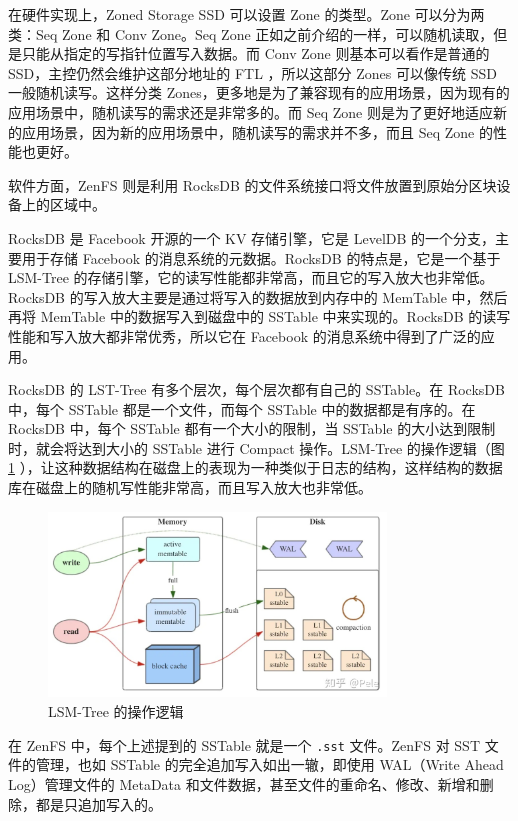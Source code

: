在硬件实现上，Zoned Storage SSD 可以设置 Zone 的类型。Zone 可以分为两类：Seq Zone 和 Conv Zone。Seq Zone 正如之前介绍的一样，可以随机读取，但是只能从指定的写指针位置写入数据。而 Conv Zone 则基本可以看作是普通的 SSD，主控仍然会维护这部分地址的 FTL ，所以这部分 Zones 可以像传统 SSD 一般随机读写。这样分类 Zones，更多地是为了兼容现有的应用场景，因为现有的应用场景中，随机读写的需求还是非常多的。而 Seq Zone 则是为了更好地适应新的应用场景，因为新的应用场景中，随机读写的需求并不多，而且 Seq Zone 的性能也更好。

软件方面，ZenFS 则是利用 RocksDB 的文件系统接口将文件放置到原始分区块设备上的区域中。

RocksDB 是 Facebook 开源的一个 KV 存储引擎，它是 LevelDB 的一个分支，主要用于存储 Facebook 的消息系统的元数据。RocksDB 的特点是，它是一个基于 LSM-Tree 的存储引擎，它的读写性能都非常高，而且它的写入放大也非常低。RocksDB 的写入放大主要是通过将写入的数据放到内存中的 MemTable 中，然后再将 MemTable 中的数据写入到磁盘中的 SSTable 中来实现的。RocksDB 的读写性能和写入放大都非常优秀，所以它在 Facebook 的消息系统中得到了广泛的应用。

RocksDB 的 LST-Tree 有多个层次，每个层次都有自己的 SSTable。在 RocksDB 中，每个 SSTable 都是一个文件，而每个 SSTable 中的数据都是有序的。在 RocksDB 中，每个 SSTable 都有一个大小的限制，当 SSTable 的大小达到限制时，就会将达到大小的 SSTable 进行 Compact 操作。LSM-Tree 的操作逻辑（图 \ref{lsm-tree} ），让这种数据结构在磁盘上的表现为一种类似于日志的结构，这样结构的数据库在磁盘上的随机写性能非常高，而且写入放大也非常低。

\begin{figure}[htbp]
    \centering
    \includegraphics[width=0.8\textwidth]{fig/lsm-tree}
    \caption{LSM-Tree 的操作逻辑}
    \label{lsm-tree}
\end{figure}

在 ZenFS 中，每个上述提到的 SSTable 就是一个 \verb|.sst| 文件。ZenFS 对 SST 文件的管理，也如 SSTable 的完全追加写入如出一辙，即使用 WAL（Write Ahead Log）管理文件的 MetaData 和文件数据，甚至文件的重命名、修改、新增和删除，都是只追加写入的。

